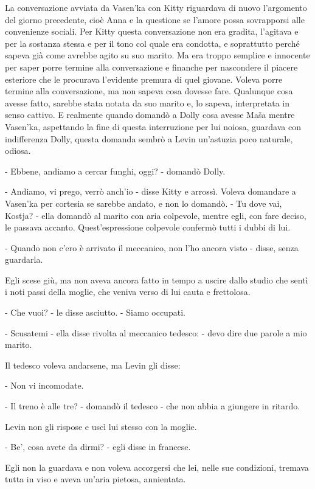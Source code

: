 La conversazione avviata da Vasen'ka con Kitty riguardava di nuovo l'argomento del giorno precedente, cioè Anna e la questione se l'amore possa sovrapporsi alle convenienze sociali. Per Kitty questa conversazione non era gradita, l'agitava e per la sostanza stessa e per il tono col quale era condotta, e soprattutto perché sapeva già come avrebbe agito su suo marito. Ma era troppo semplice e innocente per saper porre termine alla conversazione e finanche per nascondere il piacere esteriore che le procurava l'evidente premura di quel giovane. Voleva porre termine alla conversazione, ma non sapeva cosa dovesse fare. Qualunque cosa avesse fatto, sarebbe stata notata da suo marito e, lo sapeva, interpretata in senso cattivo. E realmente quando domandò a Dolly cosa avesse Maša mentre Vasen'ka, aspettando la fine di questa interruzione per lui noiosa, guardava con indifferenza Dolly, questa domanda sembrò a Levin un'astuzia poco naturale, odiosa. 

- Ebbene, andiamo a cercar funghi, oggi? - domandò Dolly. 

- Andiamo, vi prego, verrò anch'io - disse Kitty e arrossì. Voleva domandare a Vasen'ka per cortesia se sarebbe andato, e non lo domandò. - Tu dove vai, Kostja? - ella domandò al marito con aria colpevole, mentre egli, con fare deciso, le passava accanto. Quest'espressione colpevole confermò tutti i dubbi di lui. 

- Quando non c'ero è arrivato il meccanico, non l'ho ancora visto - disse, senza guardarla. 

Egli scese giù, ma non aveva ancora fatto in tempo a uscire dallo studio che sentì i noti passi della moglie, che veniva verso di lui cauta e frettolosa. 

- Che vuoi? - le disse asciutto. - Siamo occupati. 

- Scusatemi - ella disse rivolta al meccanico tedesco: - devo dire due parole a mio marito. 

Il tedesco voleva andarsene, ma Levin gli disse: 

- Non vi incomodate. 

- Il treno è alle tre? - domandò il tedesco - che non abbia a giungere in ritardo. 

Levin non gli rispose e uscì lui stesso con la moglie. 

- Be', cosa avete da dirmi? - egli disse in francese. 

Egli non la guardava e non voleva accorgersi che lei, nelle sue condizioni, tremava tutta in viso e aveva un'aria pietosa, annientata. 

